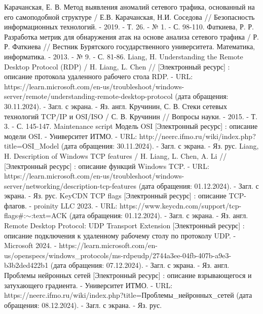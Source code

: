 \documentclass[bachelor, och, coursework]{SCWorks}
\begin{document}
\begin{thebibliography}{15}
    Карачанская, Е. В. Метод выявления аномалий сетевого трафика, основанный на его самоподобной структуре / Е.В. Карачанская, Н.И. Соседова // 
    Безопасность информационных технологий. - 2019. - Т. 26. - № 1. - С. 98-110.
    Фаткиева, Р. Р. Разработка метрик для обнаружения атак на основе анализа сетевого трафика / Р. Р. Фаткиева // Вестник Бурятского государственного университета. 
    Математика, информатика. - 2013. - № 9. - С. 81-86.
    Liang, H. Understanding the Remote Desktop Protocol (RDP) / H. Liang, L. Chen // [Электронный ресурс] : описание протокола удаленного рабочего стола RDP. - 
    URL: https://learn.microsoft.com/en-us/troubleshoot/windows-server/remote/understanding-remote-desktop-protocol (дата обращения: 30.11.2024). - Загл. с экрана. - Яз. англ.
    Кручинин, С. В. Стеки сетевых технологий TCP/IP и OSI/ISO / С. В. Кручинин // Вопросы науки. - 2015. - Т. 3. - С. 145-147.
    Maintenance script Модель OSI [Электронный ресурс] : описание модели OSI. - Университет ИТМО. - URL: http://neerc.ifmo.ru/wiki/index.php?title=OSI_Model 
    (дата обращения: 30.11.2024). - Загл. с экрана. - Яз. рус.
    Liang, H. Description of Windows TCP features /  H. Liang, L. Chen, A. Li // [Электронный ресурс] : описание функций Windows TCP. - URL: 
    https://learn.microsoft.com/en-us/troubleshoot/windows-server/networking/description-tcp-features (дата обращения: 01.12.2024). - Загл. с экрана. -  Яз. рус.
    KeyCDN TCP flags [Электронный ресурс] : описание TCP-флагов. - proinity LLC 2023. - URL: https://www.keycdn.com/support/tcp-flags\#:$\sim$:text=ACK 
    (дата обращения: 01.12.2024). - Загл. с экрана. -  Яз. англ.
    Remote Desktop Protocol: UDP Transport Extension [Электронный ресурс] : описание подключения к удаленному рабочему столу по протоколу UDP. - Microsoft 2024. - 
    https://learn.microsoft.com/en-us/openspecs/windows_protocols/ms-rdpeudp/2744a3ee-04fb-407b-a9e3-b3b2ded422b1 (дата обращения: 07.12.2024). - Загл. с экрана. -  Яз. англ.
    Проблемы нейронных сетей [Электронный ресурс] : описание взрывающегося и затухающего градиента. - Университет ИТМО. - URL: https://neerc.ifmo.ru/wiki/index.php?title=Проблемы_нейронных_сетей (дата обращения: 08.12.2024). - Загл. с экрана. -  Яз. рус.

\end{thebibliography}
\end{document}
